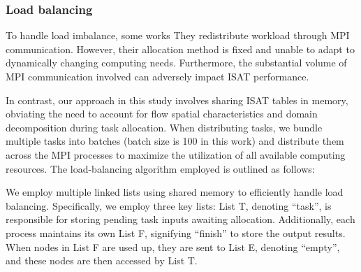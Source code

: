 


\subsubsection{Load balancing}


To handle load imbalance, some works \cite{lu2009computationally,wu2018parallel} They redistribute workload through MPI communication. However, their allocation method is fixed and unable to adapt to dynamically changing computing needs. Furthermore, the substantial volume of MPI communication involved can adversely impact ISAT performance.

In contrast, our approach in this study involves sharing ISAT tables in memory, obviating the need to account for flow spatial characteristics and domain decomposition during task allocation. When distributing tasks, we bundle multiple tasks into batches (batch size is 100 in this work) and distribute them across the MPI processes to maximize the utilization of all available computing resources. The load-balancing algorithm employed is outlined as follows:



We employ multiple linked lists using shared memory to efficiently handle load balancing. Specifically, we employ three key lists: List T, denoting ``task'', is responsible for storing pending task inputs awaiting allocation. Additionally, each process maintains its own List F, signifying ``finish'' to store the output results. When nodes in List F are used up, they are sent to List E, denoting ``empty'', and these nodes are then accessed by List T.

